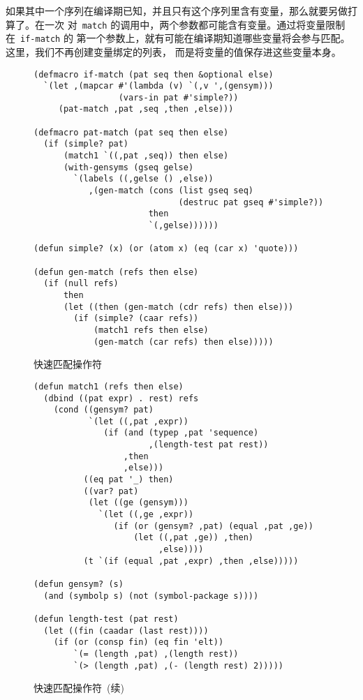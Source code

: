 如果其中一个序列在编译期已知，并且只有这个序列里含有变量，那么就要另做打算了。在一次
对~\texttt{match} 的调用中，两个参数都可能含有变量。通过将变量限制在~\texttt{if-match} 的
第一个参数上，就有可能在编译期知道哪些变量将会参与匹配。这里，我们不再创建变量绑定的列表，
而是将变量的值保存进这些变量本身。

\begin{figure}
\begin{lstlisting}
(defmacro if-match (pat seq then &optional else)
  `(let ,(mapcar #'(lambda (v) `(,v ',(gensym)))
                 (vars-in pat #'simple?))
     (pat-match ,pat ,seq ,then ,else)))

(defmacro pat-match (pat seq then else)
  (if (simple? pat)
      (match1 `((,pat ,seq)) then else)
      (with-gensyms (gseq gelse)
        `(labels ((,gelse () ,else))
           ,(gen-match (cons (list gseq seq)
                             (destruc pat gseq #'simple?))
                       then
                       `(,gelse))))))

(defun simple? (x) (or (atom x) (eq (car x) 'quote)))

(defun gen-match (refs then else)
  (if (null refs)
      then
      (let ((then (gen-match (cdr refs) then else)))
        (if (simple? (caar refs))
            (match1 refs then else)
            (gen-match (car refs) then else)))))
\end{lstlisting}
  \caption{快速匹配操作符}
  \label{fig:fast_matching_operator}
  \label{macro:if-match}
\end{figure}

\begin{figure}
\begin{lstlisting}
(defun match1 (refs then else)
  (dbind ((pat expr) . rest) refs
    (cond ((gensym? pat)
           `(let ((,pat ,expr))
              (if (and (typep ,pat 'sequence)
                       ,(length-test pat rest))
                  ,then
                  ,else)))
          ((eq pat '_) then)
          ((var? pat)
           (let ((ge (gensym)))
             `(let ((,ge ,expr))
                (if (or (gensym? ,pat) (equal ,pat ,ge))
                    (let ((,pat ,ge)) ,then)
                         ,else))))
          (t `(if (equal ,pat ,expr) ,then ,else)))))

(defun gensym? (s)
  (and (symbolp s) (not (symbol-package s))))

(defun length-test (pat rest)
  (let ((fin (caadar (last rest))))
    (if (or (consp fin) (eq fin 'elt))
        `(= (length ,pat) ,(length rest))
        `(> (length ,pat) ,(- (length rest) 2)))))
\end{lstlisting}
  \caption{快速匹配操作符~(续)}
  \label{fig:fast_matching_operator_continued}
\end{figure}

